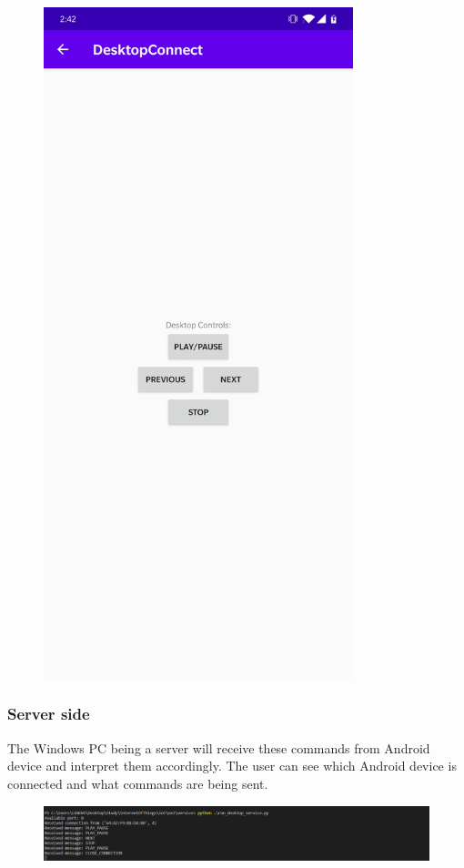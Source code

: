 \documentclass{article}
\begin{document}
\begin{enumerate}
\begin{figure}[ht]
\centering
\includegraphics[width=90mm]{./control.jpg}
\end{figure}

\end{enumerate}


\subsubsection{Server side}
The Windows PC being a server will receive these commands from Android device and interpret them
accordingly. The user can see which Android device is connected and what commands are being sent.

\begin{figure}[ht]
\centering
\includegraphics[scale=.3]{./service.png}
\end{figure}
\end{document}
